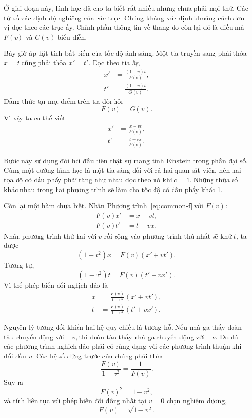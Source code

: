 Ở giai đoạn này, hình học đã cho ta biết rất nhiều nhưng chưa phải mọi thứ. Các tử số xác định độ nghiêng của các trục. Chúng không xác định khoảng cách đơn vị dọc theo các trục ấy. Chính phần thông tin về thang đo còn lại đó là điều mà \(F(v)\) và \(G(v)\) biểu diễn.

Bây giờ áp đặt tính bất biến của tốc độ ánh sáng. Một tia truyền sang phải thỏa \(x=t\) cũng phải thỏa \(x'=t'\). Dọc theo tia ấy,
\begin{align}
x'&=\frac{(1-v)t}{F(v)},\\
t'&=\frac{(1-v)t}{G(v)}.
\end{align}
Đẳng thức tại mọi điểm trên tia đòi hỏi
\begin{equation}
F(v)=G(v).
\end{equation}
Vì vậy ta có thể viết
\begin{align}
x'&=\frac{x-vt}{F(v)},\\
t'&=\frac{t-vx}{F(v)}.
\label{eq:common-f}
\end{align}

Bước này sử dụng đòi hỏi đầu tiên thật sự mang tính Einstein trong phần đại số. Cùng một đường hình học là một tia sáng đối với cả hai quan sát viên, nên hai tọa độ có dấu phẩy phải tăng như nhau dọc theo nó khi \(c=1\). Những thừa số khác nhau trong hai phương trình sẽ làm cho tốc độ có dấu phẩy khác 1.

Còn lại một hàm chưa biết. Nhân Phương trình~\eqref{eq:common-f} với \(F(v)\):
\begin{align}
F(v)x'&=x-vt,\\
F(v)t'&=t-vx.
\end{align}
Nhân phương trình thứ hai với \(v\) rồi cộng vào phương trình thứ nhất sẽ khử \(t\), ta được
\begin{equation}
(1-v^2)x=F(v)(x'+vt').
\end{equation}
Tương tự,
\begin{equation}
(1-v^2)t=F(v)(t'+vx').
\end{equation}
Vì thế phép biến đổi nghịch đảo là
\begin{align}
x&=\frac{F(v)}{1-v^2}(x'+vt'),\\
t&=\frac{F(v)}{1-v^2}(t'+vx').
\end{align}

Nguyên lý tương đối khiến hai hệ quy chiếu là tương hỗ. Nếu nhà ga thấy đoàn tàu chuyển động với \(+v\), thì đoàn tàu thấy nhà ga chuyển động với \(-v\). Do đó các phương trình nghịch đảo phải có cùng dạng với các phương trình thuận khi đổi dấu \(v\). Các hệ số đứng trước của chúng phải thỏa
\begin{equation}
\frac{F(v)}{1-v^2}=\frac{1}{F(v)}.
\end{equation}
Suy ra
\begin{equation}
F(v)^2=1-v^2,
\end{equation}
và tính liên tục với phép biến đổi đồng nhất tại \(v=0\) chọn nghiệm dương,
\begin{equation}
F(v)=\sqrt{1-v^2}.
\end{equation}

